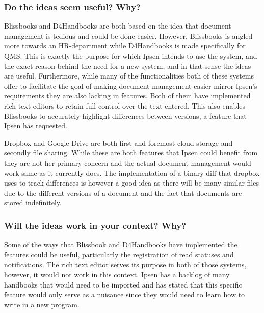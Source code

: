 \subsubsection*{Do the ideas seem useful? Why?}

Blissbooks and D4Handbooks are both based on the idea that document management is tedious and could be done easier.
However, Blissbooks is angled more towards an HR-department while D4Handbooks is made specifically for QMS.
This is exactly the purpose for which Ipsen intends to use the system, and the exact reason behind the need for a new system, and in that sense the ideas are useful.
Furthermore, while many of the functionalities both of these systems offer to facilitate the goal of making document management easier mirror Ipsen's requirements they are also lacking in features.
Both of them have implemented rich text editors to retain full control over the text entered. 
This also enables Blissbooks to accurately highlight differences between versions, a feature that Ipsen has requested.

Dropbox and Google Drive are both first and foremost cloud storage and secondly file sharing. 
While these are both features that Ipsen could benefit from they are not her primary concern and the actual document management would work same as it currently does.
The implementation of a binary diff that dropbox uses to track differences is however a good idea as there will be many similar files due to the different versions of a document and the fact that documents are stored indefinitely.



\subsubsection*{Will the ideas work in your context? Why?}

Some of the ways that Blissbook and D4Handbooks have implemented the features could be useful, particularly the registration of read statuses and notifications.
The rich text editor serves its purpose in both of those systems, however, it would not work in this context.
Ipsen has a backlog of many handbooks that would need to be imported and has stated that this specific feature would only serve as a nuisance since they would need to learn how to write in a new program.

